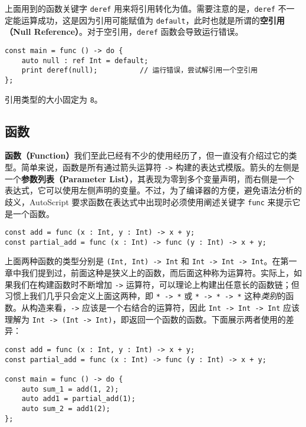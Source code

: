 上面用到的函数关键字 \lstinline!deref! 用来将引用转化为值。需要注意的是，\lstinline!deref! 不一定能运算成功，这是因为引用可能赋值为 \lstinline!default!，此时也就是所谓的\textbf{空引用（Null Reference）}。对于空引用，\lstinline!deref! 函数会导致运行错误。

\begin{lstlisting}
const main = func () -> do {
    auto null : ref Int = default;
    print deref(null);          // 运行错误，尝试解引用一个空引用
};
\end{lstlisting}

引用类型的大小固定为 \lstinline!8!。


\subsection{函数}

\textbf{函数（Function）}我们至此已经有不少的使用经历了，但一直没有介绍过它的类型。简单来说，函数是所有通过箭头运算符 \lstinline!->! 构建的表达式模版。箭头的左侧是一个\textbf{参数列表（Parameter List）}，其表现为零到多个变量声明，而右侧是一个表达式，它可以使用左侧声明的变量。不过，为了编译器的方便，避免语法分析的歧义，AutoScript 要求函数在表达式中出现时必须使用阐述关键字 \lstinline!func! 来提示它是一个函数。

\begin{lstlisting}
const add = func (x : Int, y : Int) -> x + y;
const partial_add = func (x : Int) -> func (y : Int) -> x + y;
\end{lstlisting}

上面两种函数的类型分别是 \lstinline!(Int, Int) -> Int! 和 \lstinline!Int -> Int -> Int!。在第一章中我们提到过，前面这种是狭义上的函数，而后面这种称为运算符。实际上，如果我们在构建函数时不断增加 \lstinline!->! 运算符，可以理论上构建出任意长的函数链；但习惯上我们几乎只会定义上面这两种，即 \lstinline!* -> *! 或 \lstinline!* -> * -> *! 这种\emph{类别}的函数。从构造来看，\lstinline!->! 应该是一个右结合的运算符，因此 \lstinline!Int -> Int -> Int! 应该理解为 \lstinline!Int -> (Int -> Int)!，即返回一个函数的函数。下面展示两者使用的差异：

\begin{lstlisting}
const add = func (x : Int, y : Int) -> x + y;
const partial_add = func (x : Int) -> func (y : Int) -> x + y;

const main = func () -> do {
    auto sum_1 = add(1, 2);
    auto add1 = partial_add(1);
    auto sum_2 = add1(2);
};
\end{lstlisting}

